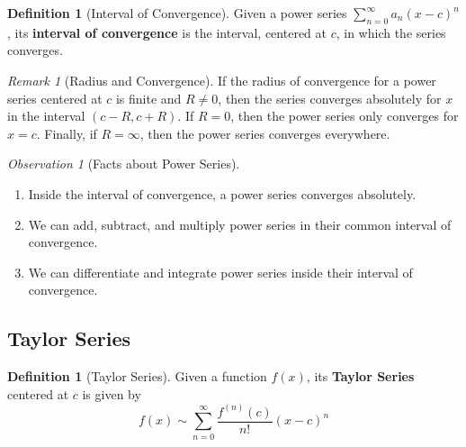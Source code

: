 \documentclass[12pt]{article}
\theoremstyle{definition}
\newtheorem{defn}[thm]{Definition}
\theoremstyle{remark}
\newtheorem{rmk}[thm]{Remark}
\newtheorem{obs}[thm]{Observation}
\numberwithin{equation}{section}
\newcommand\B[1]{\textbf{ #1}}
\begin{document}
\vspace{1cm}

\begin{defn}[Interval of Convergence]
        Given a power series $\sum\limits_{n=0}^{\infty}a_n (x-c)^n$, its \B{interval of convergence} is the interval, centered at $c$, in which the series converges.
\end{defn}



\vspace{1cm}

\begin{rmk}[Radius and Convergence]
        If the radius of convergence for a power series centered at $c$ is finite and $R \neq 0$, then the series converges absolutely for $x$ in the interval $(c - R, c + R)$. If $R = 0$, then the power series only converges for $x = c$. Finally, if $R = \infty$, then the power series converges everywhere.
\end{rmk}


\vspace{1cm}

\begin{obs}[Facts about Power Series]
        \begin{enumerate}
                \item Inside the interval of convergence, a power series converges absolutely.
                \item We can add, subtract, and multiply power series in their common interval of convergence.
                \item We can differentiate and integrate power series inside their interval of convergence.
        \end{enumerate}
\end{obs}


\vspace{1cm}

\subsection{Taylor Series}


\begin{defn}[Taylor Series]
        Given a function $f(x)$, its \B{Taylor Series} centered at $c$ is given by \begin{equation}
                f(x) \sim \sum\limits_{n=0}^{\infty}\frac{f^{(n)}(c)}{n!}(x-c)^n
        \end{equation}
\end{defn}
\end{document}
